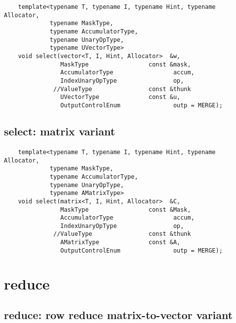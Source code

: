 \begin{verbatim}
    template<typename T, typename I, typename Hint, typename Allocator,
             typename MaskType,
             typename AccumulatorType,
             typename UnaryOpType,
             typename UVectorType>
    void select(vector<T, I, Hint, Allocator>  &w,
                MaskType                 const &mask,
                AccumulatorType                 accum,
                IndexUnaryOpType                op,
              //ValueType                const &thunk
                UVectorType              const &u,
                OutputControlEnum               outp = MERGE);
\end{verbatim}


\subsection{{\sf select}: matrix variant}

\paragraph{\syntax}

\begin{verbatim}
    template<typename T, typename I, typename Hint, typename Allocator,
             typename MaskType,
             typename AccumulatorType,
             typename UnaryOpType,
             typename AMatrixType>
    void select(matrix<T, I, Hint, Allocator>  &C,
                MaskType                 const &Mask,
                AccumulatorType                 accum,
                IndexUnaryOpType                op,
              //ValueType                const &thunk
                AMatrixType              const &A,
                OutputControlEnum               outp = MERGE);
\end{verbatim}


\section{{\sf reduce}}


\subsection{{\sf reduce}: row reduce matrix-to-vector variant}

